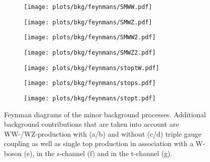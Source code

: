 \begin{figure}
	\centering
	\begin{subfigure}{0.4\textwidth}
		\texttt{[image: plots/bkg/feynmans/SMWW.pdf]}
		\caption{}
		\label{fig:bkg:fy_WWtgc}
	\end{subfigure}
	\begin{subfigure}{0.4\textwidth}
		\texttt{[image: plots/bkg/feynmans/SMWZ.pdf]}
		\caption{}
		\label{fig:bkg:fy_WZtgc}
	\end{subfigure}
	\begin{subfigure}{0.4\textwidth}
		\texttt{[image: plots/bkg/feynmans/SMWW2.pdf]}
		\caption{}
		\label{fig:bkg:fy_WWSM}
	\end{subfigure}
	\begin{subfigure}{0.4\textwidth}
		\texttt{[image: plots/bkg/feynmans/SMWZ2.pdf]}
		\caption{}
		\label{fig:bkg:fy_WZSM}
	\end{subfigure}
	\begin{subfigure}{0.3\textwidth}
		\texttt{[image: plots/bkg/feynmans/stoptW.pdf]}
		\caption{}
		\label{fig:bkg:fy_stoptw}
	\end{subfigure}
	\begin{subfigure}{0.4\textwidth}
		\texttt{[image: plots/bkg/feynmans/stops.pdf]}
		\caption{}
		\label{fig:bkg:fy_stops}
	\end{subfigure}
	\begin{subfigure}{\textwidth}
		\centering
		\texttt{[image: plots/bkg/feynmans/stopt.pdf]}
		\caption{}
		\label{fig:bkg:fy_stopt}
	\end{subfigure}
	\caption[Feynman diagrams of the minor background processes.]{Feynman diagrams of the minor background processes. Additional background contributions that are taken into account are WW-/WZ-production with (a/b) and without (c/d) triple gauge coupling as well as single top production in association with a W-boson (e), in the s-channel (f) and in the t-channel (g).}
\end{figure}

\clearpage
